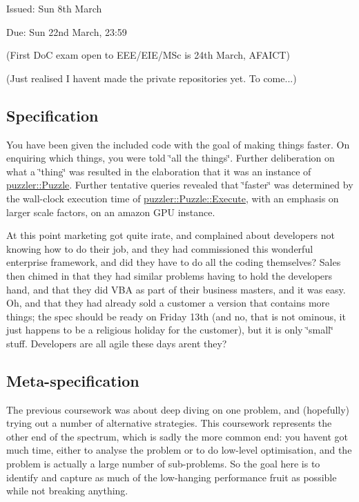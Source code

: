 
\begin{DoxyItemize}
\item Issued\+: Sun 8th March
\item Due\+: Sun 22nd March, 23\+:59
\end{DoxyItemize}

(First Do\+C exam open to E\+E\+E/\+E\+I\+E/\+M\+Sc is 24th March, A\+F\+A\+I\+C\+T)

(Just realised I haven\textquotesingle{}t made the private repositories yet. To come...)

\subsection*{Specification }

You have been given the included code with the goal of making things faster. On enquiring which things, you were told \char`\"{}all the things\char`\"{}. Further deliberation on what a \char`\"{}thing\char`\"{} was resulted in the elaboration that it was an instance of {\ttfamily \hyperlink{a00026}{puzzler\+::\+Puzzle}}. Further tentative queries revealed that \char`\"{}faster\char`\"{} was determined by the wall-\/clock execution time of {\ttfamily \hyperlink{a00026_a702021085703421ec4997ef90cf41385}{puzzler\+::\+Puzzle\+::\+Execute}}, with an emphasis on larger scale factors, on an amazon G\+P\+U instance.

At this point marketing got quite irate, and complained about developers not knowing how to do their job, and they had commissioned this wonderful enterprise framework, and did they have to do all the coding themselves? Sales then chimed in that they had similar problems having to hold the developers hand, and that they did V\+B\+A as part of their business masters, and it was easy. Oh, and that they had already sold a customer a version that contains more things; the spec should be ready on Friday 13th (and no, that is not ominous, it just happens to be a religious holiday for the customer), but it is only \char`\"{}small\char`\"{} stuff. Developers are all agile these days aren\textquotesingle{}t they?

\subsection*{Meta-\/specification }

The previous coursework was about deep diving on one problem, and (hopefully) trying out a number of alternative strategies. This coursework represents the other end of the spectrum, which is sadly the more common end\+: you haven\textquotesingle{}t got much time, either to analyse the problem or to do low-\/level optimisation, and the problem is actually a large number of sub-\/problems. So the goal here is to identify and capture as much of the low-\/hanging performance fruit as possible while not breaking anything.

